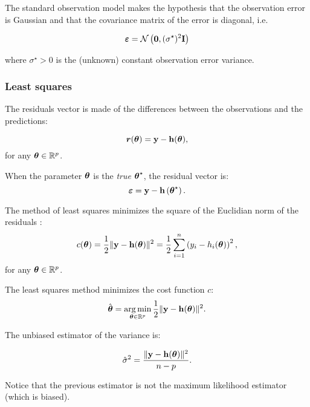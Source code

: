 \documentclass{beamer}
\begin{document}

\begin{frame}
The standard observation model makes the hypothesis that the 
observation error is Gaussian and that the covariance
matrix of the error is diagonal, i.e.

$$
\boldsymbol{\varepsilon} = \mathcal{N}\left({\bf 0}, (\sigma^\star)^2 {\bf I}\right)
$$

where $\sigma^\star > 0$ is the (unknown) constant observation error
variance.

\end{frame}


\begin{frame}
\frametitle{Least squares}

The residuals vector is made of the differences between the observations 
and the predictions:

$$
\boldsymbol{r}(\boldsymbol{\theta}) = {\bf y} - {\bf h}(\boldsymbol{\theta}),
$$
for any $\boldsymbol{\theta} \in\mathbb{R}^p$. 

When the parameter $\boldsymbol{\theta}$ is the \emph{true} $\boldsymbol{\theta}^\star$, the residual 
vector is:
$$
\boldsymbol{\varepsilon} = {\bf y} - {\bf h}\left(\boldsymbol{\theta}^\star\right).
$$


The method of least squares minimizes the square
of the Euclidian norm of the residuals \cite{Bjorck1996}:
$$
c(\boldsymbol{\theta}) 
= \frac{1}{2} \|{\bf y} - {\bf h}(\boldsymbol{\theta})\|^2 
= \frac{1}{2} \sum_{i=1}^n \left( y_i - h_i(\boldsymbol{\theta}) \right)^2,
$$
for any $\boldsymbol{\theta} \in \mathbb{R}^p$.


\end{frame}


\begin{frame}
The least squares method minimizes the cost function $c$:
$$
\hat{\boldsymbol{\theta}} 
= \operatorname*{arg\,min}_{\boldsymbol{\theta} \in \mathbb{R}^p} \frac{1}{2} \|{\bf y} - {\bf h}(\boldsymbol{\theta})\|^2.
$$

The unbiased estimator of the variance is:

$$
\hat{\sigma}^2 = \frac{\|{\bf y} - {\bf h}(\boldsymbol{\theta})\|^2}{n - p}.
$$

Notice that the previous estimator is not the maximum likelihood
estimator (which is biased).
\end{frame}

\end{document}
